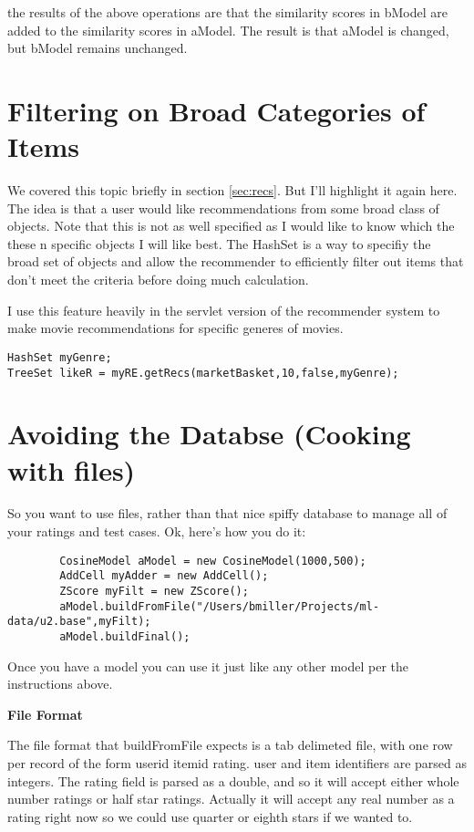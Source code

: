 \documentclass[12pt]{article}
\begin{document}
the results of the above operations are that the similarity scores in
bModel are added to the similarity scores in aModel.  The result is
that aModel is changed, but bModel remains unchanged.

\section{Filtering on Broad Categories of Items}
\label{sec:filtering}

We covered this topic briefly in section \ref{sec:recs}.  But I'll
highlight it again here.  The idea is that a user would like
recommendations from some broad class of objects.  Note that this is
not as well specified as I would like to know which the these n
specific objects I will like best.  The HashSet is a way to specifiy
the broad set of objects and allow the recommender to efficiently
filter out items that don't meet the criteria before doing much
calculation.

I use this feature heavily in the servlet version of the recommender
system to make movie recommendations for specific generes of movies.

\begin{lstlisting}
HashSet myGenre;
TreeSet likeR = myRE.getRecs(marketBasket,10,false,myGenre);
\end{lstlisting}


\section{Avoiding the Databse (Cooking with files)}
\label{sec:files}
So you want to use files, rather than that nice spiffy database to
manage all of your ratings and test cases.  Ok, here's how you do it:

\begin{lstlisting}
        CosineModel aModel = new CosineModel(1000,500);
        AddCell myAdder = new AddCell();
        ZScore myFilt = new ZScore();
        aModel.buildFromFile("/Users/bmiller/Projects/ml-data/u2.base",myFilt);
        aModel.buildFinal();
\end{lstlisting}

Once you have a model you can use it just like any other model per the
instructions above.

\textbf{File Format}

The file format that buildFromFile expects is a tab delimeted file,
with one row per record of the form userid itemid rating.  user and
item identifiers are parsed as integers.  The rating field is parsed
as a double, and so it will accept either whole number ratings or 
half star ratings.  Actually it will accept any real number as a
rating right now so we could use quarter or eighth stars if we wanted
to.
\end{document}
